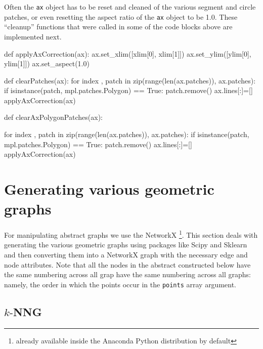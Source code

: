Often the \verb|ax| object has to be reset and cleaned of the various segment and circle patches, or even resetting the 
aspect ratio of the \verb|ax| object to be 1.0. These ``cleanup'' functions that were called in some of the code blocks above 
are implemented next. 

\nwenddocs{}\plusendmoddef\nwstartdeflinemarkup{}\nwenddeflinemarkup
def applyAxCorrection(ax):
      ax.set_xlim([xlim[0], xlim[1]])
      ax.set_ylim([ylim[0], ylim[1]])
      ax.set_aspect(1.0)

def clearPatches(ax):
    for index , patch in zip(range(len(ax.patches)), ax.patches):
        if isinstance(patch, mpl.patches.Polygon) == True:
            patch.remove()
    ax.lines[:]=[]
    applyAxCorrection(ax)

def clearAxPolygonPatches(ax):

    for index , patch in zip(range(len(ax.patches)), ax.patches):
        if isinstance(patch, mpl.patches.Polygon) == True:
            patch.remove()
    ax.lines[:]=[]
    applyAxCorrection(ax)
\nwendcode{}\nwdocspar


\section{Generating various geometric graphs}

For manipulating abstract graphs we use the NetworkX \cite{hagberg2008exploring} \footnote{already available inside the Anaconda Python distribution by default}. 
This section deals with generating the various geometric graphs using packages like Scipy and Sklearn and then converting them into a NetworkX graph
with the necessary edge and node attributes. Note that all the nodes in the abstract constructed below have the same numbering across all grap have the same 
numbering across all graphs: namely, the order in which the points occur in the \verb|points| array argument. 


\subsection{$k\text{-}$NNG}

